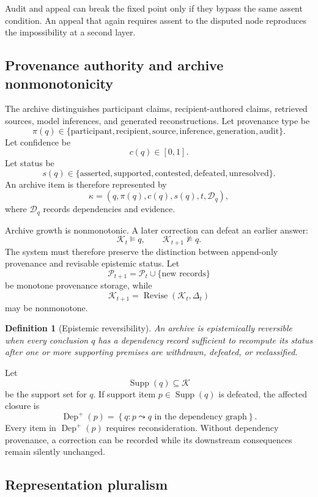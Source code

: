 \documentclass[11pt]{article}
\newtheorem{definition}{Definition}[section]
\theoremstyle{definition}
\newcommand{\K}{\mathcal{K}}
\begin{document}
Audit and appeal can break the fixed point only if they bypass the same assent condition. An appeal that again requires assent to the disputed node reproduces the impossibility at a second layer.

\subsection{Provenance authority and archive nonmonotonicity}

The archive distinguishes participant claims, recipient-authored claims, retrieved sources, model inferences, and generated reconstructions. Let provenance type be
\[
\pi(q)
\in
\{
\mathrm{participant},
\mathrm{recipient},
\mathrm{source},
\mathrm{inference},
\mathrm{generation},
\mathrm{audit}
\}.
\]
Let confidence be
\[
c(q)\in[0,1].
\]
Let status be
\[
s(q)
\in
\{
\mathrm{asserted},
\mathrm{supported},
\mathrm{contested},
\mathrm{defeated},
\mathrm{unresolved}
\}.
\]
An archive item is therefore represented by
\[
\kappa
=
(q,\pi(q),c(q),s(q),t,\mathcal{D}_q),
\]
where \(\mathcal{D}_q\) records dependencies and evidence.

Archive growth is nonmonotonic. A later correction can defeat an earlier answer:
\[
\K_t\models q,
\qquad
\K_{t+1}\nvDash q.
\]
The system must therefore preserve the distinction between append-only provenance and revisable epistemic status. Let
\[
\mathcal{P}_{t+1}
=
\mathcal{P}_t\cup\{\text{new records}\}
\]
be monotone provenance storage, while
\[
\K_{t+1}
=
\operatorname{Revise}(\K_t,\Delta_t)
\]
may be nonmonotone.

\begin{definition}[Epistemic reversibility]
An archive is epistemically reversible when every conclusion \(q\) has a dependency record sufficient to recompute its status after one or more supporting premises are withdrawn, defeated, or reclassified.
\end{definition}

Let
\[
\operatorname{Supp}(q)
\subseteq\K
\]
be the support set for \(q\). If support item \(p\in\operatorname{Supp}(q)\) is defeated, the affected closure is
\[
\operatorname{Dep}^{+}(p)
=
\left\{
q:p\leadsto q
\text{ in the dependency graph}
\right\}.
\]
Every item in \(\operatorname{Dep}^{+}(p)\) requires reconsideration. Without dependency provenance, a correction can be recorded while its downstream consequences remain silently unchanged.

\subsection{Representation pluralism}
\end{document}
